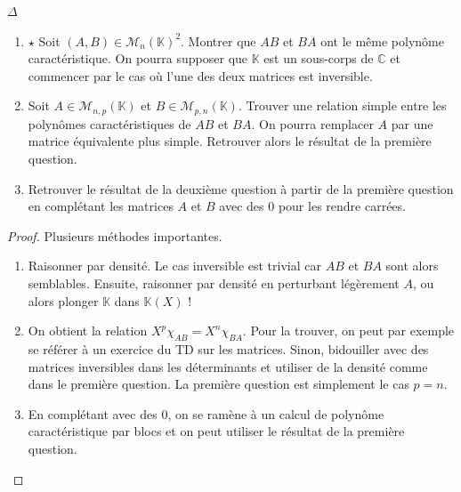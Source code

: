 \documentclass[french,a4paper]{article}
\newcommand{\C}{\mathbb{C}}
\newcommand{\K}{\mathbb{K}}
\theoremstyle{plain}
\theoremstyle{definition}
\theoremstyle{remark}
\begin{document}
\begin{ex}{$\Delta$}
	\begin{enumerate}
		\item $\star$ Soit $(A,B)\in\mathcal{M}_n(\K)^2$. Montrer que $AB$ et $BA$ ont le même polynôme caractéristique. On pourra supposer que $\K$ est un sous-corps de $\C$ et commencer par le cas où l'une des deux matrices est inversible.
		\item Soit $A\in\mathcal{M}_{n,p}(\K)$ et $B\in\mathcal{M}_{p,n}(\K)$. Trouver une relation simple entre les polynômes caractéristiques de $AB$ et $BA$. On pourra remplacer $A$ par une matrice équivalente plus simple. Retrouver alors le résultat de la première question.
		\item Retrouver le résultat de la deuxième question à partir de la première question en complétant les matrices $A$ et $B$ avec des $0$ pour les rendre carrées.
	\end{enumerate}
\end{ex}
\begin{proof}
	Plusieurs méthodes importantes.
	\begin{enumerate}
		\item Raisonner par densité. Le cas inversible est trivial car $AB$ et $BA$ sont alors semblables. Ensuite, raisonner par densité en perturbant légèrement $A$, ou alors plonger $\K$ dans $\K(X)$ !
		\item On obtient la relation $X^p\chi_{AB}=X^n\chi_{BA}$. Pour la trouver, on peut par exemple se référer à un exercice du TD sur les matrices. Sinon, bidouiller avec des matrices inversibles dans les déterminants et utiliser de la densité comme dans le première question. La première question est simplement le cas $p=n$.
		\item En complétant avec des $0$, on se ramène à un calcul de polynôme caractéristique par blocs et on peut utiliser le résultat de la première question.
	\end{enumerate}
\end{proof}
\end{document}
